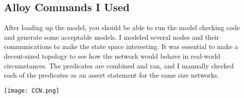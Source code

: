 \documentclass{article}
\begin{document}
\subsection{Alloy Commands I Used}

After loading up the model, you should be able to run the model checking code and generate some acceptable models. I modeled several nodes and their communications to make the state space interesting. It was essential to make a decent-sized topology to see how the network would behave in real-world circumstances. The predicates are combined and ran, and I manually checked each of the predicates as an assert statement for the same size networks. 

\centering
\texttt{[image: CCN.png]}

\clearpage
\printbibliography
\end{document}
